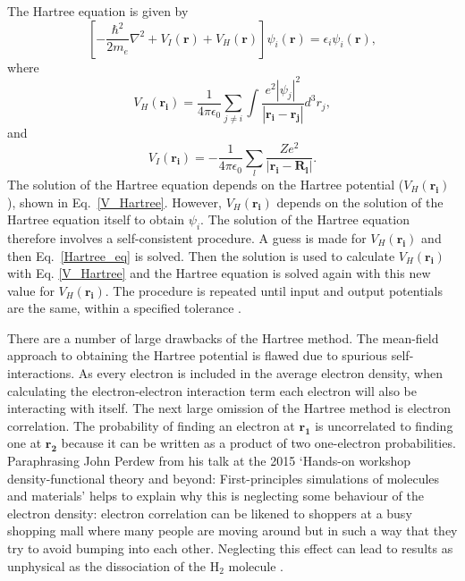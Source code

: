 \documentclass[11pt, twoside]{report}
\begin{document}
The Hartree equation is given by 
\begin{equation}\label{Hartree_eq}
\left[ -\frac{\hbar^2}{2m_e}\nabla^2 + V_I(\boldsymbol{r}) + V_H(\boldsymbol{r}) \right] \psi_i(\boldsymbol{r}) = \epsilon_i \psi_i(\boldsymbol{r}),
\end{equation}
where
\begin{equation}\label{V_Hartree}
V_H(\boldsymbol{r_i}) = \frac{1}{4 \pi \epsilon_0} \sum_{j \neq i} \int \frac{ e^2 |\psi_j|^2}{|\boldsymbol{r_i} - \boldsymbol{r_j}|}  d^3r_j,
\end{equation}
and 
\begin{equation}\label{V_I}
V_I(\boldsymbol{r_i}) = -\frac{1}{4 \pi \epsilon_0} \sum_l \frac{Ze^2}{|\boldsymbol{r_i} - \boldsymbol{R_l}|}.
\end{equation}
The solution of the Hartree equation depends on the Hartree potential ($V_H(\boldsymbol{r_i})$), shown in Eq.~\ref{V_Hartree}. However, $V_H(\boldsymbol{r_i})$ depends on the solution of the Hartree equation itself to obtain $\psi_i$. The solution of the Hartree equation therefore involves a self-consistent procedure. A guess is made for $V_H(\boldsymbol{r_i})$ and then Eq.~\ref{Hartree_eq} is solved. Then the solution is used to calculate $V_H(\boldsymbol{r_i})$ with Eq. \ref{V_Hartree} and the Hartree equation is solved again with this new value for $V_H(\boldsymbol{r_i})$. The procedure is repeated until input and output potentials are the same, within a specified tolerance \cite{Prasad_ch2}.

There are a number of large drawbacks of the Hartree method. The mean-field approach to obtaining the Hartree potential is flawed due to spurious self-interactions. 
As every electron is included in the average electron density, when calculating the electron-electron interaction term each electron will also be interacting with itself.
The next large omission of the Hartree method is electron correlation. The probability of finding an electron at $\boldsymbol{r_1}$ is uncorrelated to finding one at $\boldsymbol{r_2}$ because it can be written as a product of two one-electron probabilities. Paraphrasing John Perdew from his talk at the 2015 `Hands-on workshop density-functional theory and beyond: First-principles simulations of molecules and materials' helps to explain why this is neglecting some behaviour of the electron density: electron correlation can be likened to shoppers at a busy shopping mall where many people are moving around but in such a way that they try to avoid bumping into each other. Neglecting this effect can lead to results as unphysical as the dissociation of the H$_2$ molecule \cite{Prasad_ch2}.
\end{document}

